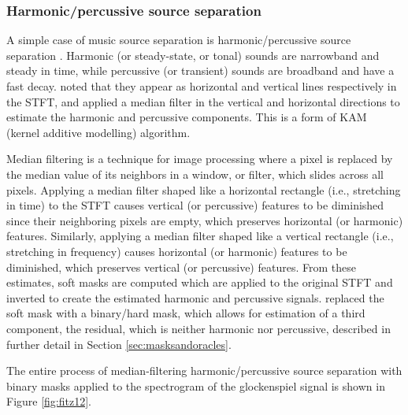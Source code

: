 \documentclass[report.tex]{subfiles}
\begin{document}
\subsubsection{Harmonic/percussive source separation}
\label{sec:hpss}

A simple case of music source separation is harmonic/percussive source separation \parencite{musicsepgood}. Harmonic (or steady-state, or tonal) sounds are narrowband and steady in time, while percussive (or transient) sounds are broadband and have a fast decay. \textcite{fitzgerald1} noted that they appear as horizontal and vertical lines respectively in the STFT, and applied a median filter in the vertical and horizontal directions to estimate the harmonic and percussive components. This is a form of KAM (kernel additive modelling) algorithm.

Median filtering is a technique for image processing where a pixel is replaced by the median value of its neighbors in a window, or filter, which slides across all pixels. Applying a median filter shaped like a horizontal rectangle (i.e., stretching in time) to the STFT causes vertical (or percussive) features to be diminished since their neighboring pixels are empty, which preserves horizontal (or harmonic) features. Similarly, applying a median filter shaped like a vertical rectangle (i.e., stretching in frequency) causes horizontal (or harmonic) features to be diminished, which preserves vertical (or percussive) features. From these estimates, soft masks are computed which are applied to the original STFT and inverted to create the estimated harmonic and percussive signals. \textcite{driedger} replaced the soft mask with a binary/hard mask, which allows for estimation of a third component, the residual, which is neither harmonic nor percussive, described in further detail in Section \ref{sec:masksandoracles}.

The entire process of median-filtering harmonic/percussive source separation with binary masks applied to the spectrogram of the glockenspiel signal is shown in Figure \ref{fig:fitz12}.
\end{document}
